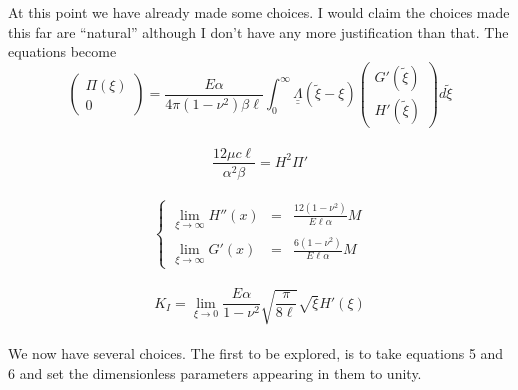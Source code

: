 \documentclass{article}
\begin{document}
At this point we have already made some choices. I would claim the
choices made this far are ``natural'' although I don't have any more
justification than that. The equations become
\\
\begin{equation}
 \left( \begin{array}{c} \Pi(\xi) \\ 0 \end{array} \right) =
\frac{E\alpha}{4\pi (1-\nu^2)\beta \ell} \int_0^{\infty} 
\underline{\underline{\Lambda}}(\tilde{\xi}- \xi) 
\left( \begin{array}{c} G'(\tilde{\xi}) \\[4pt] H'(\tilde{\xi}) \end{array} 
\right) d\tilde{\xi}
\end{equation}
\\
\begin{equation}
\frac{12\mu c\ell}{\alpha^2 \beta}  = H^2 \Pi'
\end{equation}
\\
\begin{equation}
\left\{ \begin{array}{ccc}
\displaystyle \lim_{\xi\to\infty} H''(x) & = & \frac{12(1-\nu^2)}
{E\ell\alpha} M \\
\displaystyle \lim_{\xi\to\infty} G'(x) & = & \frac{6(1-\nu^2)}{E\ell\alpha} M 
\end{array} \right.
\end{equation}
\\
\begin{equation}
K_I = \lim_{\xi\to 0} \frac{E\alpha}{1-\nu^2} \sqrt{\frac{\pi}{8\ell}} 
\sqrt{\xi} H'(\xi)
\end{equation}
\\
We now have several choices. The first to be explored, is to take equations
5 and 6 and set the dimensionless parameters appearing in them to unity.
\end{document}
